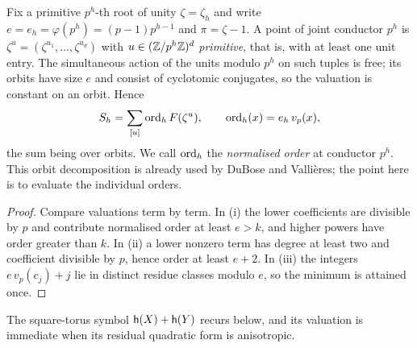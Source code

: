 Fix a primitive $p^h$-th root of unity $\zeta=\zeta_h$ and write
$e=e_h=\varphi(p^h)=(p-1)p^{h-1}$ and $\pi=\zeta-1$. A point of joint
conductor $p^h$ is $\zeta^u=(\zeta^{u_1},\dots,\zeta^{u_d})$ with
$u\in(\mathbb{Z}/p^h\mathbb{Z})^d$ \emph{primitive}, that is, with at least one unit entry.
The simultaneous action of the units modulo $p^h$ on such tuples is free;
its orbits have size $e$ and consist of cyclotomic conjugates, so the
valuation is constant on an orbit. Hence
\begin{equation}\label{gra:eq:orbits}
 S_h=\sum_{[u]}\operatorname{ord}_h F(\zeta^u),\qquad \operatorname{ord}_h(x)=e_h\,v_p(x),
\end{equation}
the sum being over orbits. We call $\operatorname{ord}_h$ the \emph{normalised order} at
conductor $p^h$. This orbit decomposition is already used by DuBose and
Valli\`eres; the point here is to evaluate the individual orders.


\begin{proof}
Compare valuations term by term. In (i) the lower coefficients are
divisible by $p$ and contribute normalised order at least $e>k$, and higher
powers have order greater than $k$. In (ii) a lower nonzero term has degree
at least two and coefficient divisible by $p$, hence order at least $e+2$.
In (iii) the integers $e\,v_p(c_j)+j$ lie in distinct residue classes
modulo $e$, so the minimum is attained once.
\end{proof}

The square-torus symbol $\mathsf{h}(X)+\mathsf{h}(Y)$ recurs below, and its valuation
is immediate when its residual quadratic form is anisotropic.


